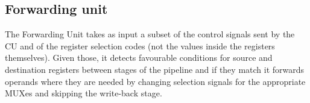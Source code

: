 \subsection{Forwarding unit}
The Forwarding Unit takes as input a subset of the control signals sent by the CU and of the register selection codes (not the values inside the registers themselves). Given those, it detects favourable conditions for source and destination registers between stages of the pipeline and if they match it forwards operands where they are needed by changing selection signals for the appropriate MUXes and skipping the write-back stage.